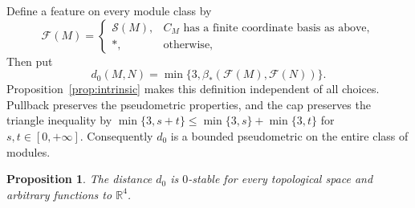 \documentclass[11pt]{article}
\newtheorem{proposition}[theorem]{Proposition}
\newcommand{\R}{\mathbb R}
\begin{document}
Define a feature on every module class by
\[
 \mathcal F(M)=
 \begin{cases}
 \mathcal S(M),& C_M\text{ has a finite coordinate basis as above},\\
 *,&\text{otherwise},
 \end{cases}
\]
Then put
\[
 d_0(M,N)=\min\{3,\beta_*(\mathcal F(M),\mathcal F(N))\}.
\]
Proposition~\ref{prop:intrinsic} makes this definition independent of all
choices. Pullback preserves the pseudometric properties, and the cap preserves
the triangle inequality by
$\min\{3,s+t\}\leq\min\{3,s\}+\min\{3,t\}$ for
$s,t\in[0,+\infty]$. Consequently $d_0$ is a bounded pseudometric on the
entire class of modules.

\begin{proposition}\label{prop:stable}
The distance $d_0$ is $0$-stable for every topological space and arbitrary
functions to $\R^4$.
\end{proposition}
\end{document}
